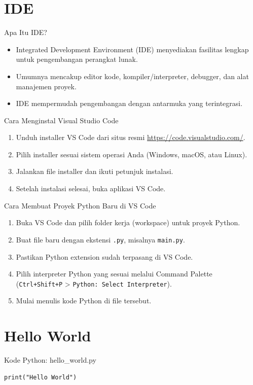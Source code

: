 \documentclass[aspectratio=169, table]{beamer}
\begin{document}
\section{IDE}
\begin{frame}[fragile]{Apa Itu IDE?}
\begin{itemize}
\item Integrated Development Environment (IDE) menyediakan fasilitas lengkap untuk pengembangan perangkat lunak.
\item Umumnya mencakup editor kode, kompiler/interpreter, debugger, dan alat manajemen proyek.
\item IDE mempermudah pengembangan dengan antarmuka yang terintegrasi.
\end{itemize}
\end{frame}

\begin{frame}[fragile]{Cara Menginstal Visual Studio Code}
\begin{enumerate}
\item Unduh installer VS Code dari situs resmi \url{https://code.visualstudio.com/}.
\item Pilih installer sesuai sistem operasi Anda (Windows, macOS, atau Linux).
\item Jalankan file installer dan ikuti petunjuk instalasi.
\item Setelah instalasi selesai, buka aplikasi VS Code.
\end{enumerate}
\end{frame}

\begin{frame}[fragile]{Cara Membuat Proyek Python Baru di VS Code}
\begin{enumerate}
\item Buka VS Code dan pilih folder kerja (workspace) untuk proyek Python.
\item Buat file baru dengan ekstensi \texttt{.py}, misalnya \texttt{main.py}.
\item Pastikan Python extension sudah terpasang di VS Code.
\item Pilih interpreter Python yang sesuai melalui Command Palette (\texttt{Ctrl+Shift+P} > \texttt{Python: Select Interpreter}).
\item Mulai menulis kode Python di file tersebut.
\end{enumerate}
\end{frame}

\section{Hello World}
\begin{frame}[fragile]{Kode Python: hello_world.py}
\begin{lstlisting}[style=PythonStyle]
print("Hello World")
\end{lstlisting}
\end{frame}
\end{document}
